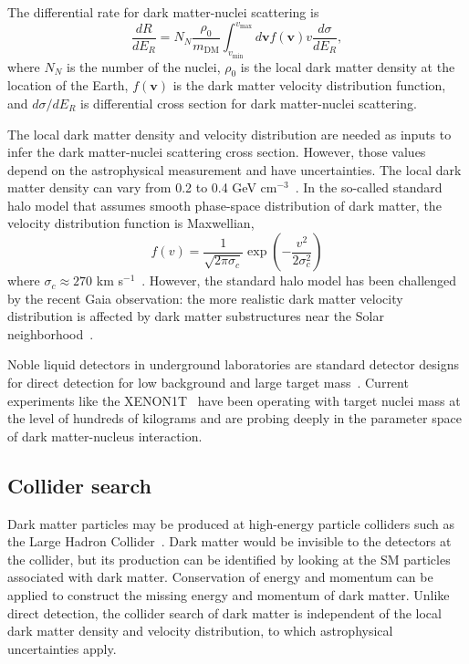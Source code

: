 \documentclass[doublespace,nopageskip]{VTthesis} %
\begin{document}
The differential rate for dark matter-nuclei scattering is
\begin{equation}
    \frac{dR}{dE_R} = N_N\frac{\rho_0}{m_\mathrm{DM}}\int_{v_\mathrm{min}}^{v_\mathrm{max}}d\bm{v}f(\bm{v})v\frac{d\sigma}{dE_R},
\end{equation}
where $N_N$ is the number of the nuclei, $\rho_0$ is the local dark matter density at the location of the Earth, $f(\bm{v})$ is the dark matter velocity distribution function, and $d\sigma/dE_R$ is differential cross section for dark matter-nuclei scattering.

The local dark matter density and velocity distribution are needed as inputs to infer the dark matter-nuclei scattering cross section. However, those values depend on the astrophysical measurement and have uncertainties. The local dark matter density can vary from 0.2 to 0.4 GeV cm$^{-3}$~\cite{2010A&A...509A..25W}. In the so-called standard halo model that assumes smooth phase-space distribution of dark matter, the velocity distribution function is Maxwellian,
\begin{equation}
    f(v) = \frac{1}{\sqrt{2\pi \sigma_c}}\exp\left(-\frac{v^2}{2\sigma_c^2}\right)
\end{equation}
where $\sigma_c \approx 270$ km s$^{-1}$~\cite{2012PDU.....1...94B}. However, the standard halo model has been challenged by the recent Gaia observation: the more realistic dark matter velocity distribution is affected by dark matter substructures near the Solar neighborhood~\cite{2019ApJ...874....3N}. 

Noble liquid detectors in underground laboratories are standard detector designs for direct detection for low background and large target mass~\cite{2012PDU.....1...94B}. Current experiments like the XENON1T~\cite{2019PhRvL.122g1301A} have been operating with target nuclei mass at the level of hundreds of kilograms and are probing deeply in the parameter space of dark matter-nucleus interaction.

\subsection{Collider search}

Dark matter particles may be produced at high-energy particle colliders such as the Large Hadron Collider~\cite{2013IJMPA..2830052M}. Dark matter would be invisible to the detectors at the collider, but its production can be identified by looking at the SM particles associated with dark matter. Conservation of energy and momentum can be applied to construct the missing energy and momentum of dark matter. Unlike direct detection, the collider search of dark matter is independent of the local dark matter density and velocity distribution, to which astrophysical uncertainties apply.
\end{document}
